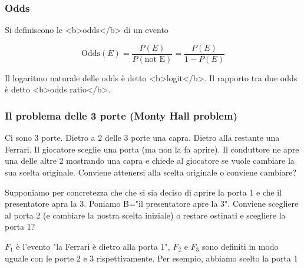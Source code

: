 \documentclass[onecolumn,12pt]{book}\usepackage[]{graphicx}\usepackage[]{color}
\begin{document}
       
        
        
\subsubsection{Odds}
        
Si definiscono le <b>odds</b> di un evento

$$\textrm{Odds}(E) = \frac{P(E)}{P(\textrm{not E})}= \frac{P(E)}{1 - P(E)}$$
        
Il logaritmo naturale delle odds è detto 
<b>logit</b>. Il rapporto tra due odds è detto <b>odds ratio</b>.

\subsubsection{Il  problema delle 3 porte (Monty Hall problem)}

Ci sono 3 porte. Dietro a 2 delle 3 porte una capra. Dietro alla restante una Ferrari.  Il giocatore sceglie una porta (ma non la fa aprire). Il conduttore ne apre una delle altre 2 mostrando una capra  e chiede al giocatore se vuole cambiare la sua scelta originale.
Conviene attenersi alla scelta originale o conviene cambiare? 

Supponiamo per concretezza che che si sia deciso di aprire la porta 1  e che il presentatore apra la 3. Poniamo B="il presentatore apre la 3". Conviene scegliere al porta 2 (e cambiare la nostra scelta iniziale) o restare ostinati e scegliere la porta 1?


$F_1$ è  l'evento "la Ferrari è dietro alla porta 1",  $F_2$ e $F_3$ sono definiti in modo uguale con le porte 2 e 3 rispettivamente.  Per esempio, abbiamo scelto la porta 1  
\end{document}
